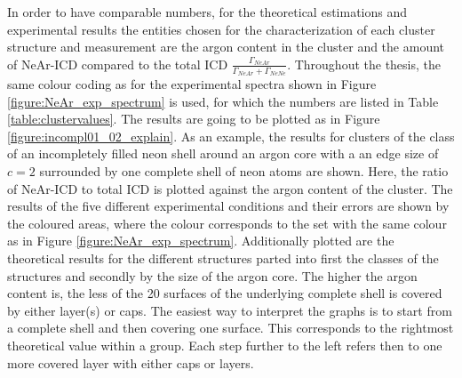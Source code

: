 In order to have comparable numbers, for the theoretical estimations and
experimental results the entities chosen for the characterization of each
cluster structure and measurement are
the argon content in the cluster and the amount of
NeAr-ICD compared to the total ICD
$\frac{\Gamma_{NeAr}}{\Gamma_{NeAr}+\Gamma_{NeNe}}$.
Throughout the thesis, the same 
colour coding as for the experimental spectra
shown in Figure \ref{figure:NeAr_exp_spectrum} is used,
for which the numbers are listed in Table \ref{table:clustervalues}.
The results are going to be plotted as in Figure \ref{figure:incompl01_02_explain}.
As an example, the results for clusters of the class of an
incompletely filled neon shell
around an argon core with a an edge size of $c=2$
surrounded by one complete shell of neon atoms are shown.
Here, the ratio of NeAr-ICD to total ICD is plotted against the argon content
of the cluster. The results of the five different experimental conditions and their
errors are shown by the coloured areas, where the colour corresponds to the
set with the same colour as in Figure \ref{figure:NeAr_exp_spectrum}.
Additionally plotted are the theoretical results for the different structures
parted into first the classes of the structures and secondly by the size of the argon core.
The higher the argon content is, the less of the 20 surfaces of the underlying
complete shell is covered by either layer(s) or caps. The easiest way to interpret
the graphs is to start from a complete shell and then covering one surface. This
corresponds to the rightmost theoretical value within a group. Each step further
to the left refers then to one more covered layer with either caps or layers.\\

